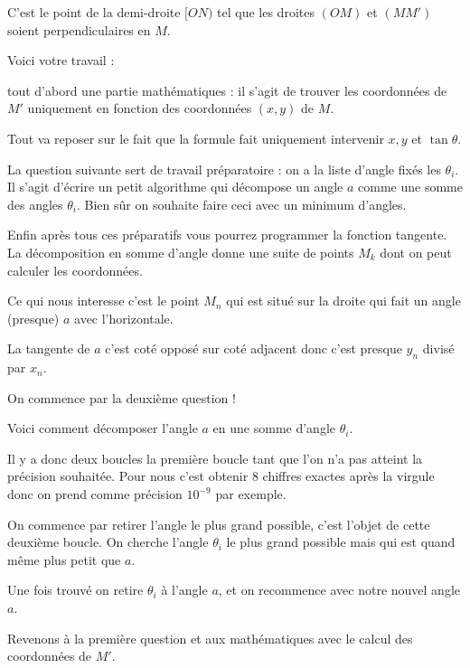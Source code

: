 C'est le point de la demi-droite $[ON)$ tel que les droites $(OM)$ 
et $(MM')$ soient perpendiculaires en $M$.



\diapo

Voici votre travail :


tout d'abord une partie mathématiques :
il s'agit de trouver les coordonnées de $M'$ uniquement en fonction 
des coordonnées $(x,y)$ de $M$.

Tout va reposer sur le fait que la formule fait uniquement intervenir $x,y$ et 
$\tan \theta$.

La question suivante sert de travail préparatoire :
on a la liste d'angle fixés les $\theta_i$. Il s'agit d’écrire un petit algorithme
qui décompose un angle $a$ comme une somme des angles $\theta_i$. Bien sûr on souhaite faire ceci avec un minimum d'angles.


Enfin après tous ces préparatifs vous pourrez programmer la fonction tangente.
La décomposition en somme d'angle donne une suite de points $M_k$ dont on peut calculer les coordonnées.

Ce qui nous interesse c'est le point $M_n$ qui est situé sur la droite 
qui fait un angle (presque) $a$ avec l'horizontale.

La tangente de $a$ c'est coté opposé sur coté adjacent donc c'est presque $y_n$ divisé par $x_n$.


\diapo

On commence par la deuxième question !

Voici comment décomposer l'angle $a$ en une somme d'angle $\theta_i$.

Il y a donc deux boucles la première boucle tant que l'on n'a pas atteint la précision souhaitée.
Pour nous c'est obtenir $8$ chiffres exactes après la virgule donc on prend comme précision $10^{-9}$ par exemple.

On commence par retirer l'angle le plus grand possible, c'est l'objet de cette deuxième boucle.
On cherche l'angle 
$\theta_i$ le plus grand possible mais qui est quand même plus petit que $a$.

Une fois trouvé on retire $\theta_i$ à l'angle $a$, et on recommence avec notre nouvel angle $a$.



\diapo

Revenons à la première question et aux mathématiques avec le calcul des coordonnées de $M'$.

